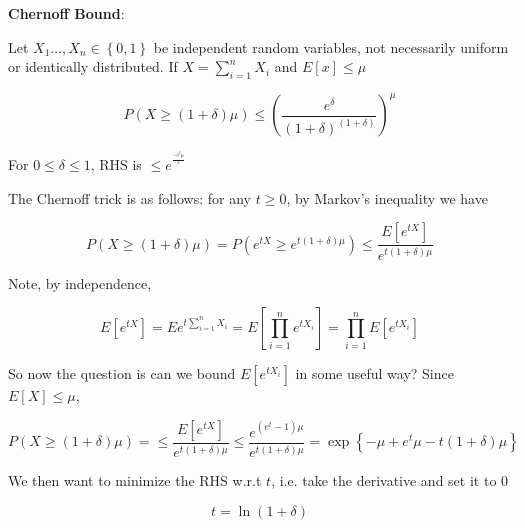 \documentclass[../notes.tex]{subfiles}
\begin{document}
\begin{definition}
    \textbf{Chernoff Bound}: 

Let $ X_1 \ldots,  X_n \in \left\{ 0, 1 \right\}  $ be independent random variables, not necessarily uniform or identically distributed. If $ X = \sum^n_{i=1} X_i $ and $ E[x] \le \mu $

\begin{equation}
    P(X \ge (1+\delta)\mu) \le  (\frac{e^\delta}{(1+\delta)^{(1+\delta)}})^\mu
\end{equation}

For $ 0 \le  \delta \le  1 $, RHS is $ \le e^{^\frac{-\delta^2\mu}{3}} $

\end{definition}


The Chernoff trick is as follows: for any $ t\ge 0 $, by Markov's inequality we have


\begin{equation}
    P(X \ge (1+\delta) \mu) = P(e^{tX} \ge e^{t(1+\delta)\mu}) \le \frac{E[e^{tX}]}{e^{t(1+\delta)\mu}}
\end{equation}


Note, by independence, 

\begin{equation}
    E[e^{tX}] = E e^{t\sum^n_{i=1} X_i}  = E \left[ \prod^n_{i=1} e^{tX_i} \right] = \prod^n_{i=1} E[e^{tX_i}]
\end{equation}


So now the question is can we bound $ E[e^{tX_i}] $ in some useful way?
Since $ E[X] \le  \mu $,

\begin{equation}
    P(X \ge (1+\delta) \mu) = \le \frac{E[e^{tX}]}{e^{t(1+\delta)\mu}} \le  \frac{e^{(e^t - 1)\mu}}{e^{t(1+\delta)\mu}} = \exp \left\{ -\mu + e^t \mu - t(1+\delta) \mu \right\} 
\end{equation}

We then want to minimize the RHS w.r.t $ t $, i.e. take the derivative and set it to 0

\begin{equation}
    t = \ln (1+\delta)
\end{equation}
\end{document}
